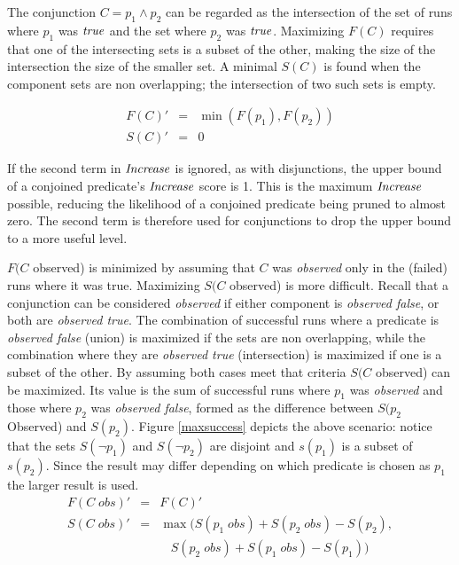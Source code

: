 The conjunction $C = p_1 \wedge p_2$ can be regarded as the intersection of the set of runs where $p_1$ was $\mathit{true}$ and the set where $p_2$ was $\mathit{true}$.  Maximizing $F(C)$ requires that one of the intersecting sets is a subset of the other, making the size of the intersection the size of the smaller set.  A minimal $S(C)$ is found when the component sets are non overlapping; the intersection of two such sets is empty.

\begin{eqnarray*}
  F(C)' &=&  \min(F(p_1),F(p_2)) \\
  S(C)' &=& 0
\end{eqnarray*}

If the second term in $\mathit{Increase}$ is ignored, as with disjunctions, the upper bound of a conjoined predicate's $\mathit{Increase}$ score is 1.  This is the maximum $\mathit{Increase}$ possible, reducing the likelihood of a conjoined predicate being pruned to almost zero.  The second term is therefore used for conjunctions to drop the upper bound to a more useful level.

$F(C$ observed) is minimized by assuming that $C$ was \textit{observed} only in the (failed) runs where it was true.  Maximizing $S(C$ observed) is more difficult.  Recall that a conjunction can be considered \textit{observed} if either component is \textit{observed false}, or both are \textit{observed true}.  The combination of successful runs where a predicate is \textit{observed false} (union) is maximized if the sets are non overlapping, while the combination where they are \textit{observed true} (intersection) is maximized if one is a subset of the other.  By assuming both cases meet that criteria $S(C$ observed) can be maximized.  Its value is the sum of successful runs where $p_1$ was \textit{observed} and those where $p_2$ was \textit{observed false}, formed as the difference between $S(p_2$  Observed) and $S(p_2)$. Figure \ref{maxsuccess} depicts the above scenario: notice that the sets $S(\neg p_1)$ and $S(\neg p_2)$ are disjoint and $s(p_1)$ is a subset of $s(p_2)$.  Since the result may differ depending on which predicate is chosen as $p_1$ the larger result is used.
\begin{eqnarray*}
  F(C\;obs)' &=& F(C)' \\
  S(C\;obs)' &=&
  \max(S(p_1\;obs)+S(p_2\;obs)-S(p_2),\\
  & &\ \ \ \ S(p_2\;obs)+S(p_1\;obs)-S(p_1))
\end{eqnarray*}

